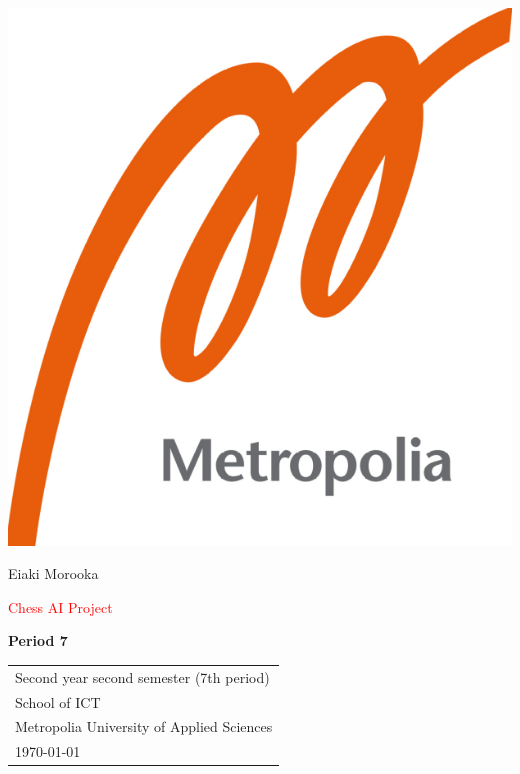 \documentclass{article}
\begin{document}
\begin{center}
\includegraphics[scale=0.2]{logo.png}
\end{center}

\vspace{0.5cm}

\begin{center}

 Eiaki Morooka \\

\vspace{0.5cm}

{\Huge \textcolor{red}{Chess AI Project}} \\


\vspace{0.5cm}

{\Large \textbf{Period 7}} \\


\end{center}

\vspace{1cm}

\begin{center}

{\Large }



\begin{tabular}{l}
 Second year second semester (7th period)\\
 School of ICT\\
 Metropolia University of Applied Sciences  \\
 \today
\end{tabular}
\end{center}
\end{document}
